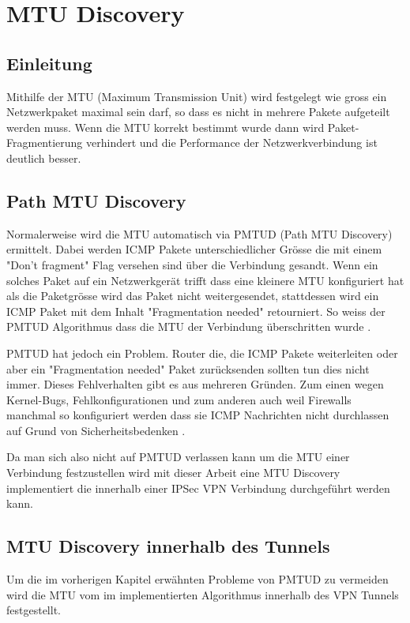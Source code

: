 \section{MTU Discovery}
\label{sec:MTU Discovery}

\subsection{Einleitung}
Mithilfe der \acs{MTU} (Maximum Transmission Unit) wird festgelegt wie gross ein Netzwerkpaket maximal sein darf, so dass es nicht in mehrere Pakete aufgeteilt werden muss. Wenn die \acs{MTU} korrekt bestimmt wurde dann wird Paket-Fragmentierung verhindert und die Performance der Netzwerkverbindung ist deutlich besser. 

\subsection{Path MTU Discovery}
Normalerweise wird die \acs{MTU} automatisch via \acs{PMTUD} (Path MTU Discovery) ermittelt. Dabei werden \acs{ICMP} Pakete unterschiedlicher Grösse die mit einem "Don't fragment" Flag versehen sind über die Verbindung gesandt. Wenn ein solches Paket auf ein Netzwerkgerät trifft dass eine kleinere \acs{MTU} konfiguriert hat als die Paketgrösse wird das Paket nicht weitergesendet, stattdessen wird ein \acs{ICMP} Paket mit dem Inhalt "Fragmentation needed" retourniert. So weiss der \acs{PMTUD} Algorithmus dass die \acs{MTU} der Verbindung überschritten wurde \cite[:131]{rfc1191}.

\acs{PMTUD} hat jedoch ein Problem. Router die, die \acs{ICMP} Pakete weiterleiten oder aber ein "Fragmentation needed" Paket zurücksenden sollten tun dies nicht immer. Dieses Fehlverhalten gibt es aus mehreren Gründen. Zum einen wegen Kernel-Bugs, Fehlkonfigurationen und zum anderen auch weil Firewalls manchmal so konfiguriert werden dass sie \acs{ICMP} Nachrichten nicht durchlassen auf Grund von Sicherheitsbedenken \cite[:137]{rfc2923}.

Da man sich also nicht auf \acs{PMTUD} verlassen kann um die \acs{MTU} einer Verbindung festzustellen wird mit dieser Arbeit eine \acs{MTU} Discovery implementiert die innerhalb einer \acs{IPSec} \acs{VPN} Verbindung durchgeführt werden kann.

\subsection{MTU Discovery innerhalb des Tunnels}
Um die im vorherigen Kapitel erwähnten Probleme von \acs{PMTUD} zu vermeiden wird die \acs{MTU} vom im \tool implementierten Algorithmus innerhalb des \acs{VPN} Tunnels festgestellt.

